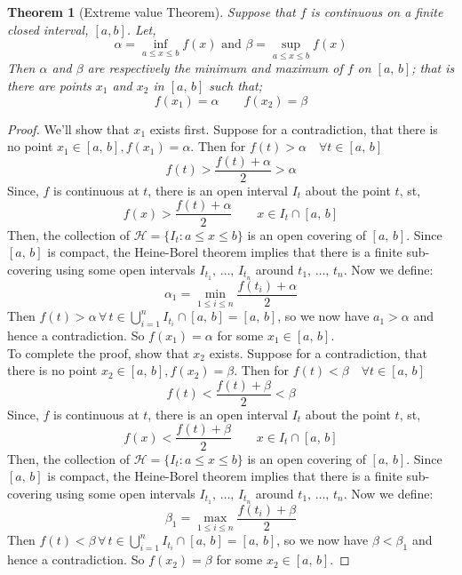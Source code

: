 \documentclass{article}
\renewcommand{\a}{\alpha}
\renewcommand{\b}{\beta}
\theoremstyle{mythmstyle}
\newtheorem{theorem}{Theorem}[subsection]
\begin{document}
\begin{theorem}[Extreme value Theorem]
  Suppose that $f$ is continuous on a finite closed interval, $[a, b]$. Let,
  $$ \a = \inf_{a\le x\le b}{f(x)}\text{ and } \b =\sup_{a\le x\le b}{f(x)} $$
  Then $\a$ and $\b$ are respectively the minimum and maximum of $f$ on $[a,\,b]$; that is there are points $x_1$ and $x_2$ in $[a,\,b]$ such that;
  $$ f(x_1) = \a \qquad f(x_2) = \b $$
\end{theorem}
\begin{proof}
  We'll show that $x_1$ exists first. Suppose for a contradiction, that there is no point $x_1 \in [a,\,b], f(x_1) = \a$. Then for $f(t) > \a\quad \forall t \in [a,\,b]$
  $$ f(t) > \frac{f(t) + \a}{2} > \a $$
  Since, $f$ is continuous at $t$, there is an open interval $I_t$ about the point $t$, st,
  $$ f(x) > \frac{f(t) + \a}{2} \qquad x\in I_t\cap[a,\, b] $$
  Then, the collection of $\displaystyle{\mathcal{H} = \{ I_t: a\le x \le b\}}$ is an open covering of $[a, \, b]$. Since $[a, \, b]$ is compact, the Heine-Borel theorem implies that there is a finite sub-covering using some open intervals $I_{t_1},\,\dots,\,I_{t_n}$ around $t_1,\,\dots,\,t_n$. Now we define:
  $$ \a_1 = \min_{1\le i \le n}{\frac{f(t_i) + \a}{2}} $$
  Then $f(t) > \a \,\forall \,t \in \bigcup_{i=1}^n{I_{t_i}\cap[a,\,b]} = [a,\,b]$, so we now have $a_1 >\a$ and hence a contradiction. So $f(x_1) = \a$ for some $x_1\in [a,\,b]$.\\

  \noindent
  To complete the proof, show that $x_2$ exists. Suppose for a contradiction, that there is no point $x_2 \in [a,\,b], f(x_2) = \b$. Then for $f(t) < \b\quad \forall t \in [a,\,b]$
  $$ f(t) < \frac{f(t) + \b}{2} < \b $$
  Since, $f$ is continuous at $t$, there is an open interval $I_t$ about the point $t$, st,
  $$ f(x) < \frac{f(t) + \b}{2} \qquad x\in I_t\cap[a,\, b] $$
  Then, the collection of $\displaystyle{\mathcal{H} = \{ I_t: a\le x \le b\}}$ is an open covering of $[a, \, b]$. Since $[a, \, b]$ is compact, the Heine-Borel theorem implies that there is a finite sub-covering using some open intervals $I_{t_1},\,\dots,\,I_{t_n}$ around $t_1,\,\dots,\,t_n$. Now we define:
  $$ \b_1 = \max_{1\le i \le n}{\frac{f(t_i) + \b}{2}} $$
  Then $f(t) < \b \,\forall \,t \in \bigcup_{i=1}^n{I_{t_i}\cap[a,\,b]} = [a,\,b]$, so we now have $\b <\b_1$ and hence a contradiction. So $f(x_2) = \b$ for some $x_2\in [a,\,b]$.
\end{proof}
\end{document}
